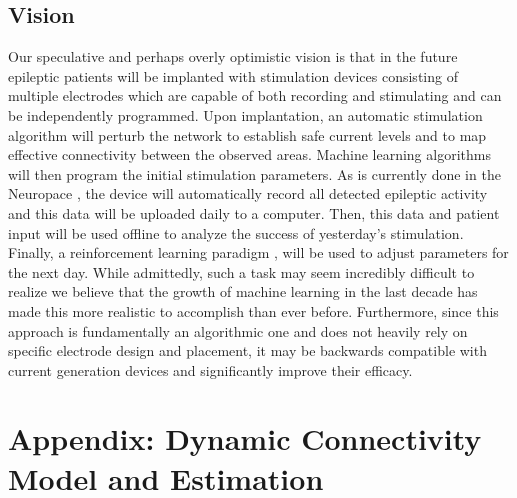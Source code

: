 \documentclass[11pt,a4paper,final]{article}
\begin{document}
\subsection{Vision}

Our speculative and perhaps overly optimistic vision is that in the future epileptic patients will be implanted with stimulation devices consisting of multiple electrodes which are capable of both recording and stimulating \citep{ryapolova14} and can be independently programmed.
Upon implantation, an automatic stimulation algorithm will perturb the network to establish safe current levels and to map effective connectivity between the observed areas.
Machine learning algorithms will then program the initial stimulation parameters.
As is currently done in the Neuropace \citep{NP}, the device will automatically record all detected epileptic activity and this data will be uploaded daily to a computer.
Then, this data and patient input will be used offline to analyze the success of yesterday's stimulation.
Finally, a reinforcement learning paradigm \citep{gosavi14}, will be used to adjust parameters for the next day.
While admittedly, such a task may seem incredibly difficult to realize we believe that the growth of machine learning in the last decade has made this more realistic to accomplish than ever before.
Furthermore, since this approach is fundamentally an algorithmic one and does not heavily rely on specific electrode design and placement, it may be backwards compatible with current generation devices and significantly improve their efficacy.  


 \renewcommand{\theequation}{A\arabic{equation}}    
\setcounter{equation}{0}  %
\section*{Appendix: Dynamic Connectivity Model and Estimation}
\end{document}
